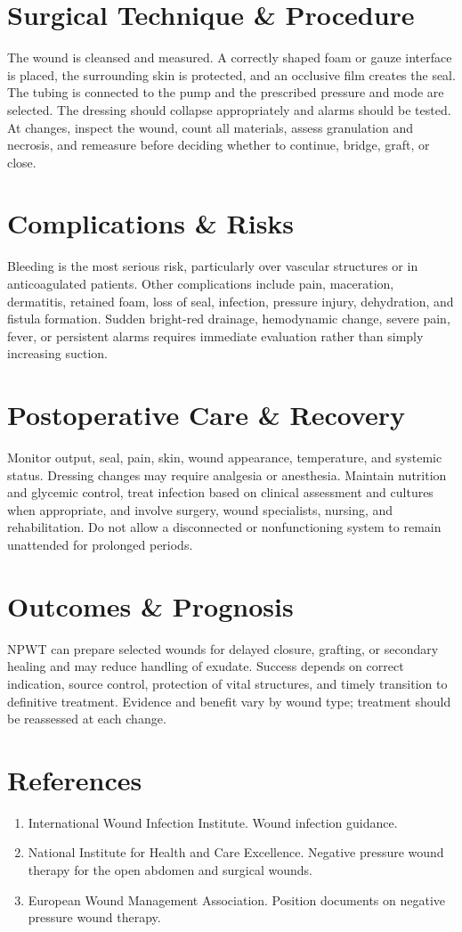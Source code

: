 \section*{Surgical Technique \& Procedure}
The wound is cleansed and measured. A correctly shaped foam or gauze interface is placed, the surrounding skin is protected, and an occlusive film creates the seal. The tubing is connected to the pump and the prescribed pressure and mode are selected. The dressing should collapse appropriately and alarms should be tested. At changes, inspect the wound, count all materials, assess granulation and necrosis, and remeasure before deciding whether to continue, bridge, graft, or close.

\section*{Complications \& Risks}
Bleeding is the most serious risk, particularly over vascular structures or in anticoagulated patients. Other complications include pain, maceration, dermatitis, retained foam, loss of seal, infection, pressure injury, dehydration, and fistula formation. Sudden bright-red drainage, hemodynamic change, severe pain, fever, or persistent alarms requires immediate evaluation rather than simply increasing suction.

\section*{Postoperative Care \& Recovery}
Monitor output, seal, pain, skin, wound appearance, temperature, and systemic status. Dressing changes may require analgesia or anesthesia. Maintain nutrition and glycemic control, treat infection based on clinical assessment and cultures when appropriate, and involve surgery, wound specialists, nursing, and rehabilitation. Do not allow a disconnected or nonfunctioning system to remain unattended for prolonged periods.

\section*{Outcomes \& Prognosis}
NPWT can prepare selected wounds for delayed closure, grafting, or secondary healing and may reduce handling of exudate. Success depends on correct indication, source control, protection of vital structures, and timely transition to definitive treatment. Evidence and benefit vary by wound type; treatment should be reassessed at each change.

\section*{References}
\begin{enumerate}
\item International Wound Infection Institute. Wound infection guidance.
\item National Institute for Health and Care Excellence. Negative pressure wound therapy for the open abdomen and surgical wounds.
\item European Wound Management Association. Position documents on negative pressure wound therapy.
\end{enumerate}
